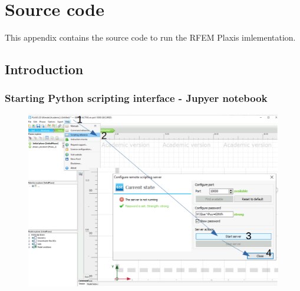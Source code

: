 
\chapter{Source code}
This appendix contains the source code to run the RFEM Plaxis imlementation.
\section{Introduction}







\subsection{Starting Python scripting interface - Jupyer notebook}
\begin{figure}[h]
        \includegraphics[width=\textwidth]{fig/strt}
	\caption{}
        \label{fig:strtplxs}
\end{figure}

